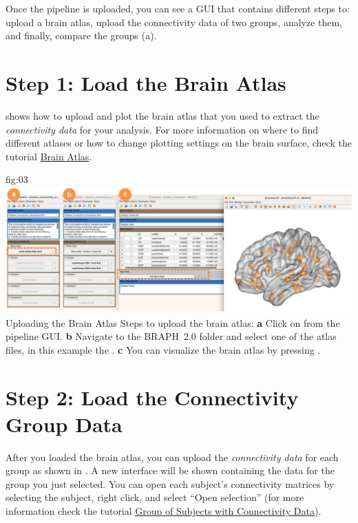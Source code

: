 \documentclass[justified]{tufte-handout}
\begin{document}
Once the pipeline is uploaded, you can see a GUI that contains different steps to: upload a brain atlas, upload the connectivity data of two groups, analyze them, and finally, compare the groups (a). 

\section{Step 1: Load the Brain Atlas}

 shows how to upload and plot the brain atlas that you used to extract the \emph{connectivity data} for your analysis. For more information on where to find different atlases or how to change plotting settings on the brain surface, check the tutorial \href{https://github.com/softmatterlab/BRAPH-2-Matlab/tree/develop/tutorials/general/tut_ba}{Brain Atlas}.

	{fig:03}
	{
	\includegraphics{fig03.jpg}
	}
	{Uploading the Brain Atlas}
	{
	Steps to upload the brain atlas:
	{\bf a} Click on  from the pipeline GUI.
	{\bf b} Navigate to the BRAPH~2.0 folder  and select one of the atlas files, in this example the . {\bf c} You can visualize the brain atlas by pressing . 
	}
 
\section{Step 2: Load the Connectivity Group Data}

After you loaded the brain atlas, you can upload the \emph{connectivity data} for each group as shown in . A new interface will be shown containing the data for the group you just selected. You can open each subject’s connectivity matrices by selecting the subject, right click, and select “Open selection” (for more information check the tutorial \href{https://github.com/softmatterlab/BRAPH-2-Matlab/tree/develop/tutorials/general/tut_gr_con}{Group of Subjects with Connectivity Data}).
\end{document}
